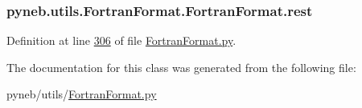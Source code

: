 \hypertarget{classpyneb_1_1utils_1_1_fortran_format_1_1_fortran_format_a6567d6b3709b1db086972c2fe1855006}{}
\subsubsection[{rest}]{\setlength{\rightskip}{0pt plus 5cm}pyneb.\+utils.\+Fortran\+Format.\+Fortran\+Format.\+rest}\label{classpyneb_1_1utils_1_1_fortran_format_1_1_fortran_format_a6567d6b3709b1db086972c2fe1855006}


Definition at line \hyperlink{_fortran_format_8py_source_l00306}{306} of file \hyperlink{_fortran_format_8py_source}{Fortran\+Format.\+py}.



The documentation for this class was generated from the following file\+:\begin{DoxyCompactItemize}
\item 
pyneb/utils/\hyperlink{_fortran_format_8py}{Fortran\+Format.\+py}\end{DoxyCompactItemize}

